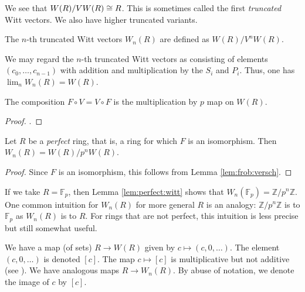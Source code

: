 We see that \(W(R) / VW(R) \cong R\).
This is sometimes called the first \textit{truncated}
Witt vectors.
We also have higher truncated variants.

\begin{defn}
	The \(n\)-th truncated Witt vectors
	\(W_{n}(R)\) are defined as
	\(W(R) / V^{n}W(R)\).
\end{defn}

We may regard the \(n\)-th truncated Witt vectors as consisting
of elements \((c_{0}, \ldots, c_{n-1})\) with addition
and multiplication by the \(S_{i}\) and \(P_{i}\).
Thus, one has \(\lim_{n} W_{n}(R) = W(R)\).

\begin{lem}
    \label{lem:frob:versch}
	The composition \(F \circ V = V \circ F\) is the multiplication by
	\(p\) map on \(W(R)\).
\end{lem}

\begin{proof}
	\cite[Proposition~5]{kim-2017-witt-vec}.
\end{proof}

\begin{lem}
    \label{lem:perfect:witt}
    Let \(R\) be a \textit{perfect} ring,
    that is, a ring for which \(F\) is an isomorphism.
    Then \(W_{n}(R) = W(R) / p^{n}W(R)\).
\end{lem}

\begin{proof}
    Since \(F\) is an isomorphism, this follows from
    Lemma \ref{lem:frob:versch}.
\end{proof}

\begin{rmk}
    If we take \(R = \mathbb{F}_{p}\), then
    Lemma \ref{lem:perfect:witt}
    shows that \(W_{n}(\mathbb{F}_{p}) = \mathbb{Z} / p^{n}\mathbb{Z}\).
    One common intuition for \(W_{n}(R)\)
    for more general \(R\) is an analogy:
    \(\mathbb{Z} / p^{n}\mathbb{Z}\)
    is to \(\mathbb{F}_{p}\)
    as \(W_{n}(R)\) is to \(R\).
    For rings that are not perfect,
    this intuition is less precise but still
    somewhat useful.
\end{rmk}

\begin{nota}
    We have a map (of sets)
    \(R \xrightarrow{} W(R)\)
    given by
    \(c \mapsto (c, 0, \ldots)\).
    The element \((c, 0, \ldots)\) is denoted
    \([c]\).
    The map \(c \mapsto [c]\) is multiplicative
    but not additive (see \cite[Section~1]{kim-2017-witt-vec}).
    We have analogous maps \(R \xrightarrow{} W_{n}(R)\).
    By abuse of notation, we denote
    the image of \(c\) by \([c]\).
\end{nota}


